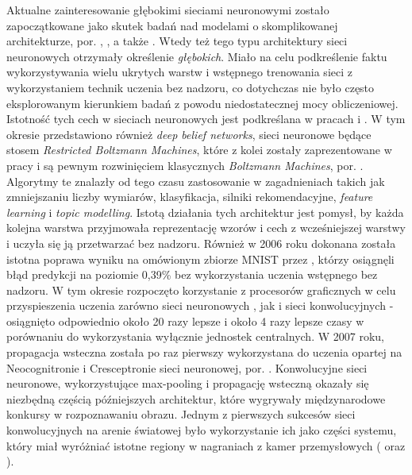 \documentclass[12pt,a4paper,twoside]{article}
\begin{document}
Aktualne zainteresowanie głębokimi sieciami neuronowymi zostało zapoczątkowane jako skutek badań nad modelami o skomplikowanej architekturze, por. \citet{hinton2006a}, \citet{hinton2006b}, a także \citet{bengio2007a}. Wtedy też tego typu architektury sieci neuronowych otrzymały określenie \textit{głębokich}. Miało na celu podkreślenie faktu wykorzystywania wielu ukrytych warstw i wstępnego trenowania sieci z wykorzystaniem technik uczenia bez nadzoru, co dotychczas nie było często eksplorowanym kierunkiem badań z powodu niedostatecznej mocy obliczeniowej. Istotność tych cech w sieciach neuronowych jest podkreślana w pracach \citet{bengio2007b} i \citet{bengio2011}.
W tym okresie przedstawiono również \textit{deep belief networks}, sieci neuronowe będące stosem \textit{Restricted Boltzmann Machines}, które z kolei zostały zaprezentowane w pracy \citet{smolensky1986} i są pewnym rozwinięciem klasycznych \textit{Boltzmann Machines}, por. \citet{hinton1986}. Algorytmy te znalazły od tego czasu zastosowanie w zagadnieniach takich jak zmniejszaniu liczby wymiarów, klasyfikacja, silniki rekomendacyjne, \textit{feature learning} i \textit{topic modelling}. Istotą działania tych architektur jest pomysł, by każda kolejna warstwa przyjmowała reprezentację wzorów i cech z wcześniejszej warstwy i uczyła się ją przetwarzać bez nadzoru. Również w 2006 roku dokonana została istotna poprawa wyniku na omówionym zbiorze MNIST przez \citet{ranzato2006}, którzy osiągnęli błąd predykcji na poziomie 0,39\% bez wykorzystania uczenia wstępnego bez nadzoru. W tym okresie rozpoczęto korzystanie z procesorów graficznych w celu przyspieszenia uczenia zarówno sieci neuronowych \citep{oh2004}, jak i sieci konwolucyjnych \citep{chellapilla2006} - osiągnięto odpowiednio około 20 razy lepsze i około 4 razy lepsze czasy w porównaniu do wykorzystania wyłącznie jednostek centralnych.
W 2007 roku, propagacja wsteczna została po raz pierwszy wykorzystana do uczenia opartej na Neocognitronie i Cresceptronie sieci neuronowej, por. \citet{ranzato2007}. Konwolucyjne sieci neuronowe, wykorzystujące max-pooling i propagację wsteczną okazały się niezbędną częścią późniejszych architektur, które wygrywały międzynarodowe konkursy w rozpoznawaniu obrazu. Jednym z pierwszych sukcesów sieci konwolucyjnych na arenie światowej było wykorzystanie ich jako części systemu, który miał wyróżniać istotne regiony w nagraniach z kamer przemysłowych (\citep{jain2009} oraz \citet{yang2009}).
\end{document}
